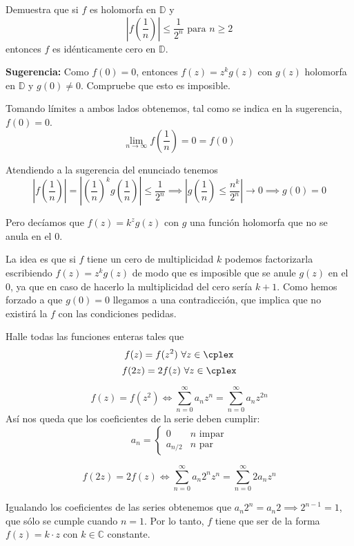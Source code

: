 \begin{problem}[3]
Demuestra que si $f$ es holomorfa en $\mathbb{D}$ y
\[\left| f\left( \frac{1}{n}\right) \right|\leq \frac{1}{2^n} \text{ para } n\geq2\]
entonces $f$ es idénticamente cero en $\mathbb{D}$.

\textbf{Sugerencia:} Como $f(0)=0$, entonces $f(z)=z^kg(z)$ con $g(z)$ holomorfa en $\mathbb{D}$ y $g(0)\neq 0$. Compruebe que esto es imposible.

\solution
{}

Tomando límites a ambos lados obtenemos, tal como se indica en la sugerencia, $f(0)=0$.
\[\lim_{n \to \infty} f\left(\frac{1}{n}\right) = 0=f(0)\]

Atendiendo a la sugerencia del enunciado tenemos
\[\left|f\left( \frac{1}{n}\right) \right| = \left| \left(\frac{1}{n}\right)^kg\left( \frac{1}{n}\right)\right|\leq \frac{1}{2^n} \implies \left| g\left( \frac{1}{n}\right) \leq \frac{n^k}{2^n}\right| \to 0 \implies g(0)=0\]

Pero decíamos que $f(z)=k^zg(z)$ con $g$ una función holomorfa que no se anula en el 0.


\obs La idea es que si $f$ tiene un cero de multiplicidad $k$ podemos factorizarla escribiendo $f(z)=z^kg(z)$ de modo que es imposible que se anule $g(z)$ en el 0, ya que en caso de hacerlo la multiplicidad del cero sería $k+1$. Como hemos forzado a que $g(0)=0$ llegamos a una contradicción, que implica que no existirá la $f$ con las condiciones pedidas.

\end{problem}

\begin{problem}[4]
Halle todas las funciones enteras tales que
\ppart
\[f(z)=f(z^2) \ \forall z \in \cplex\]
\ppart
\[f(2z)=2f(z) \ \forall z \in \cplex\]

\solution


\spart
\[f(z)=f(z^2) \iff \sum_{n=0}^{\infty}a_nz^{n} = \sum_{n=0}^{\infty}a_nz^{2n}\]
Así nos queda que los coeficientes de la serie deben cumplir:
\[a_n= \begin{cases}
             0 & n \text{ impar} \\
             a_{n/2} & n \text{ par}
             \end{cases}
  \]

\spart
{}

\[f(2z)=2f(z) \iff \sum_{n=0}^{\infty} a_n2^nz^n = \sum_{n=0}^{\infty}2a_nz^n\]

Igualando los coeficientes de las series obtenemos que $a_n2^n = a_n 2 \implies 2^{n-1} = 1$, que sólo se cumple cuando $n = 1$. Por lo tanto, $f$ tiene que ser de la forma $f(z) = k · z$ con $k ∈ ℂ$ constante.

\end{problem}

